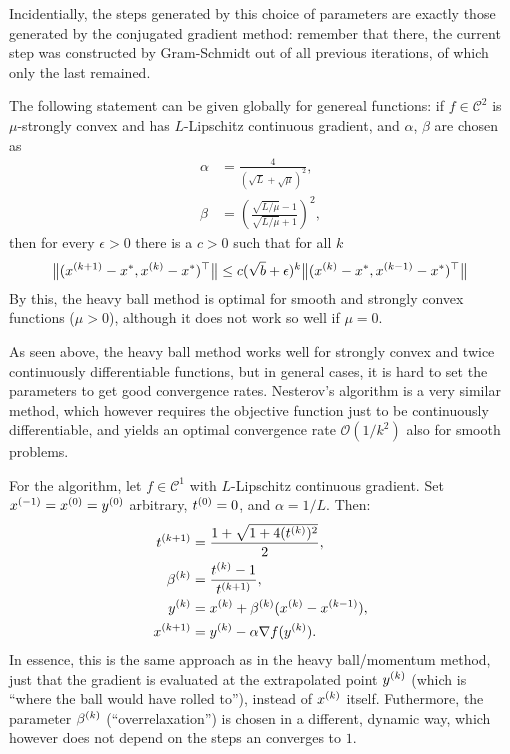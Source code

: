 \documentclass{article}
\begin{document}
Incidentially, the steps generated by this choice of parameters are exactly those generated by the
conjugated gradient method: remember that there, the current step was constructed by Gram-Schmidt
out of all previous iterations, of which only the last remained.  

The following statement can be given globally for genereal functions: if \(f \in \mathcal{C}^2\) is
\(\mu\)-strongly convex and has \(L\)-Lipschitz continuous gradient, and \(\alpha\), \(\beta\) are
chosen as
\begin{align*}
  \alpha &= \frac{4}{(\sqrt{L} + \sqrt{\mu})^2}, \\
  \beta &= \left( \frac{\sqrt{L/\mu} - 1}{\sqrt{L/\mu} + 1} \right)^2,
\end{align*}
then for every \(\epsilon > 0\) there is a \(c > 0\) such that for all \(k\)
\begin{equation*}
  \enVert[1]{\T{(\kth[k+1]{x} - x^*, \kth{x} - x^*)}}
  \leq c(\sqrt{b} + \epsilon)^k \enVert[1]{\T{(\kth[k]{x} - x^*, \kth[k-1]{x} - x^*)}}
\end{equation*}
By this, the heavy ball method is optimal for smooth and strongly convex functions (\(\mu > 0\)),
although it does not work so well if \(\mu = 0\).



As seen above, the heavy ball method works well for strongly convex and twice continuously
differentiable functions, but in general cases, it is hard to set the parameters to get good
convergence rates.  Nesterov's algorithm is a very similar method, which however requires the
objective function just to be continuously differentiable, and yields an optimal convergence rate
\(\mathcal{O}(1/k^2)\) also for smooth problems.

For the algorithm, let \(f \in \mathcal{C}^1\) with \(L\)-Lipschitz continuous gradient.  Set
\(\kth[-1]{x} = \kth[0]{x} = \kth[0]{y}\) arbitrary, \(\kth[0]{t} = 0\), and \(\alpha = 1/L\). Then:
\begin{align*}
  \kth[k+1]{t} &= \frac{1 + \sqrt{1 + 4(\kth{t})^2}}{2}, \\
  \kth{\beta} &= \frac{\kth{t} - 1}{\kth[k+1]{t}}, \\
  \kth{y} &= \kth{x} + \kth{\beta}(\kth{x} - \kth[k-1]{x}), \\
  \kth[k+1]{x} &= \kth{y} - \alpha\nabla f(\kth{y}).
\end{align*}
In essence, this is the same approach as in the heavy ball/momentum method, just that the gradient
is evaluated at the extrapolated point \(\kth{y}\) (which is ``where the ball would have rolled
to''), instead of \(\kth{x}\) itself.  Futhermore, the parameter \(\kth{\beta}\)
(``overrelaxation'') is chosen in a different, dynamic way, which however does not depend on the
steps an converges to \(1\).
\end{document}
